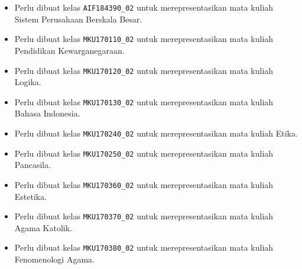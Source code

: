 \begin{enumerate}
\begin{itemize}
		\item Perlu dibuat kelas \texttt{AIF184390\_02} untuk merepresentasikan mata kuliah Sistem Perusahaan Berskala Besar.
		\item Perlu dibuat kelas \texttt{MKU170110\_02} untuk merepresentasikan mata kuliah Pendidikan Kewarganegaraan.
		\item Perlu dibuat kelas \texttt{MKU170120\_02} untuk merepresentasikan mata kuliah Logika.
		\item Perlu dibuat kelas \texttt{MKU170130\_02} untuk merepresentasikan mata kuliah Bahasa Indonesia.
		\item Perlu dibuat kelas \texttt{MKU170240\_02} untuk merepresentasikan mata kuliah Etika.
		\item Perlu dibuat kelas \texttt{MKU170250\_02} untuk merepresentasikan mata kuliah Pancasila.
		\item Perlu dibuat kelas \texttt{MKU170360\_02} untuk merepresentasikan mata kuliah Estetika.
		\item Perlu dibuat kelas \texttt{MKU170370\_02} untuk merepresentasikan mata kuliah Agama Katolik.
		\item Perlu dibuat kelas \texttt{MKU170380\_02} untuk merepresentasikan mata kuliah Fenomenologi Agama.
	\end{itemize}
	

\end{enumerate}
